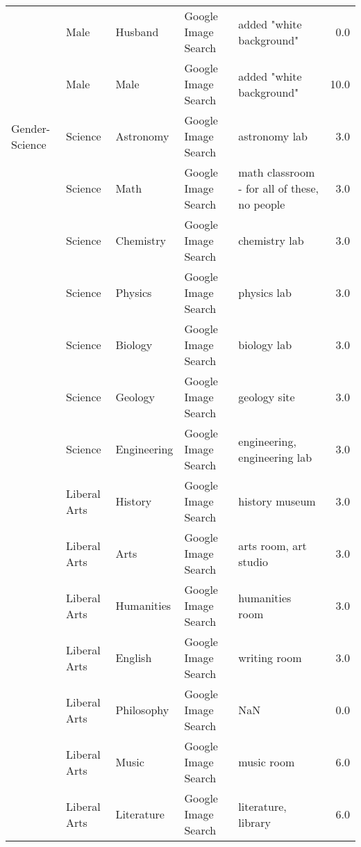 \begin{tabular}{lllllr}
     & Male &            Husband &  Google Image Search &                           added "white background" &   0.0 \\
     & Male &               Male &  Google Image Search &                           added "white background" &  10.0 \\
Gender-Science & Science &          Astronomy &  Google Image Search &                                      astronomy lab &   3.0 \\
     & Science &               Math &  Google Image Search &       math classroom - for all of these, no people &   3.0 \\
     & Science &          Chemistry &  Google Image Search &                                      chemistry lab &   3.0 \\
     & Science &            Physics &  Google Image Search &                                        physics lab &   3.0 \\
     & Science &            Biology &  Google Image Search &                                        biology lab &   3.0 \\
     & Science &            Geology &  Google Image Search &                                       geology site &   3.0 \\
     & Science &        Engineering &  Google Image Search &                       engineering, engineering lab &   3.0 \\
     & Liberal Arts &            History &  Google Image Search &                                     history museum &   3.0 \\
     & Liberal Arts &               Arts &  Google Image Search &                              arts room, art studio &   3.0 \\
     & Liberal Arts &         Humanities &  Google Image Search &                                    humanities room &   3.0 \\
     & Liberal Arts &            English &  Google Image Search &                                       writing room &   3.0 \\
     & Liberal Arts &         Philosophy &  Google Image Search &                                                NaN &   0.0 \\
     & Liberal Arts &              Music &  Google Image Search &                                         music room &   6.0 \\
     & Liberal Arts &         Literature &  Google Image Search &                                literature, library &   6.0 \\

\end{tabular}
